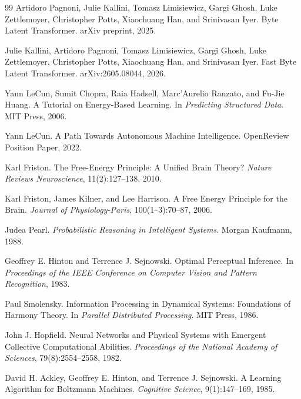 \documentclass[11pt, a4paper]{article}
\theoremstyle{srn}
\theoremstyle{srnremark}
\begin{document}
\begin{thebibliography}{99}
Artidoro Pagnoni, Julie Kallini, Tomasz Limisiewicz, Gargi Ghosh,
Luke Zettlemoyer, Christopher Potts, Xiaochuang Han, and Srinivasan Iyer.
\newblock Byte Latent Transformer.
\newblock arXiv preprint, 2025.

Julie Kallini, Artidoro Pagnoni, Tomasz Limisiewicz, Gargi Ghosh,
Luke Zettlemoyer, Christopher Potts, Xiaochuang Han, and Srinivasan Iyer.
\newblock Fast Byte Latent Transformer.
\newblock arXiv:2605.08044, 2026.

Yann LeCun, Sumit Chopra, Raia Hadsell, Marc'Aurelio Ranzato, and
Fu-Jie Huang.
\newblock A Tutorial on Energy-Based Learning.
\newblock In \textit{Predicting Structured Data}. MIT Press, 2006.

Yann LeCun.
\newblock A Path Towards Autonomous Machine Intelligence.
\newblock OpenReview Position Paper, 2022.

Karl Friston.
\newblock The Free-Energy Principle: A Unified Brain Theory?
\newblock \textit{Nature Reviews Neuroscience}, 11(2):127--138, 2010.

Karl Friston, James Kilner, and Lee Harrison.
\newblock A Free Energy Principle for the Brain.
\newblock \textit{Journal of Physiology-Paris}, 100(1--3):70--87, 2006.

Judea Pearl.
\newblock \textit{Probabilistic Reasoning in Intelligent Systems}.
\newblock Morgan Kaufmann, 1988.

Geoffrey E. Hinton and Terrence J. Sejnowski.
\newblock Optimal Perceptual Inference.
\newblock In \textit{Proceedings of the IEEE Conference on Computer Vision
and Pattern Recognition}, 1983.

Paul Smolensky.
\newblock Information Processing in Dynamical Systems: Foundations of
Harmony Theory.
\newblock In \textit{Parallel Distributed Processing}. MIT Press, 1986.

John J. Hopfield.
\newblock Neural Networks and Physical Systems with Emergent Collective
Computational Abilities.
\newblock \textit{Proceedings of the National Academy of Sciences},
79(8):2554--2558, 1982.

David H. Ackley, Geoffrey E. Hinton, and Terrence J. Sejnowski.
\newblock A Learning Algorithm for Boltzmann Machines.
\newblock \textit{Cognitive Science}, 9(1):147--169, 1985.


\end{thebibliography}
\end{document}
